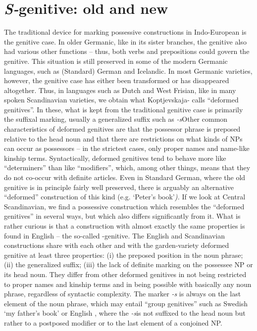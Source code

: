 
\section{\textit{S-}genitive: old and new}

The traditional device for marking possessive constructions in Indo-European is the genitive case. In older Germanic, like in its sister branches, the genitive also had various other functions – thus, both verbs and prepositions could govern the genitive. This situation is still preserved in some of the modern Germanic languages, such as (Standard) German and Icelandic. In most Germanic varieties, however, the genitive case has either been transformed or has disappeared altogether. Thus, in languages such as Dutch and West Frisian, like in many spoken Scandinavian varieties, we obtain what Koptjevskaja-\citet{Tamm2003} calls “deformed genitives”. In these, what is kept from the traditional genitive case is primarily the suffixal marking, usually a generalized suffix such as\textit{ {}-s}Other common characteristics of deformed genitives are that the possessor phrase is preposed relative to the head noun and that there are restrictions on what kinds of NPs can occur as possessors – in the strictest cases, only proper names and name-like kinship terms. Syntactically, deformed genitives tend to behave more like “determiners” than like “modifiers”, which, among other things, means that they do not co-occur with definite articles. Even in Standard German, where the old genitive is in principle fairly well preserved, there is arguably an alternative “deformed” construction of this kind (e.g. ‘Peter’s book’\textit{).} If we look at Central Scandinavian, we find a possessive construction which resembles the “deformed genitives” in several ways, but which also differs significantly from it. What is rather curious is that a construction with almost exactly the same properties is found in English – the so-called -genitive. The English and Scandinavian constructions share with each other and with the garden-variety deformed genitive at least three properties: (i) the preposed position in the noun phrase; (ii) the generalized suffix; (iii) the lack of definite marking on the possessee NP or its head noun. They differ from other deformed genitives in not being restricted to proper names and kinship terms and in being possible with basically any noun phrase, regardless of syntactic complexity. The marker\textit{ {}-s} is always on the last element of the noun phrase, which may entail “group genitives” such as Swedish  ‘my father’s book’ or English , where the\textit{ {}-s}\textstyleLinguisticExample{ }is not suffixed to the head noun but rather to a postposed modifier or to the last element of a conjoined NP. 

